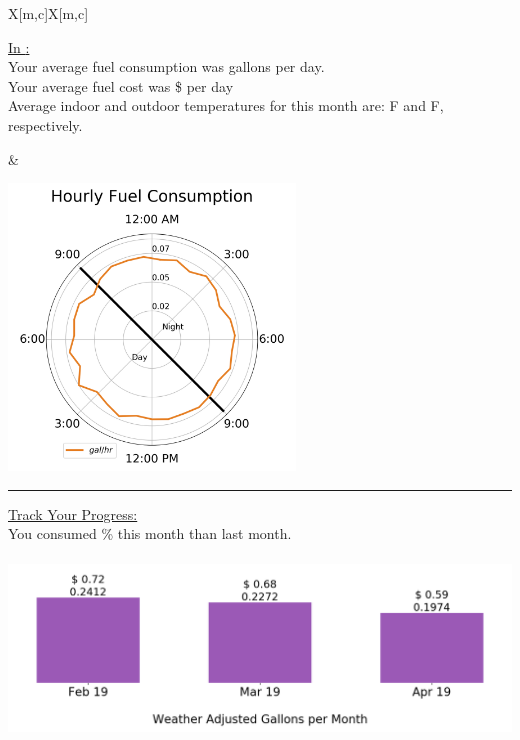 \documentclass[12pt,a4paper]{article}
\begin{document}
\begin{tabu}{X[m,c]X[m,c]}

\begin{minipage}{\linewidth}
\underline{In {\reportmonth:}}\\

Your average fuel consumption was {\fuelperday} gallons per day.\\

Your average fuel cost was \${\fuelcostperday} per day\\

Average indoor and outdoor temperatures for this month are: {\inTave} {\degree}F and {\outTave} {\degree}F, respectively.\\
\end{minipage}

&

\begin{minipage}{\linewidth}
\includegraphics[height = 3in]{monthly_polar_plot.png}
\end{minipage}


\end{tabu}

\rule{\textwidth}{1pt}
\newline

\underline{Track Your Progress:}\\

You consumed {\progress}\% {\progressmoreless} this month than last month.\\
\begin{center}
\includegraphics[height= 1.875in]{monthly_track_your_progress.png}
\end{center}
\end{document}
